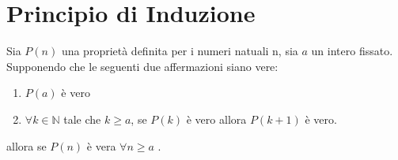 \chapter{Principio di Induzione}

\begin{defn}
Sia $P(n)$ una proprietà definita per i numeri natuali n, sia $a$ un intero fissato.
Supponendo che le seguenti due affermazioni siano vere:
\begin{enumerate}
	\item $P(a)$ è vero
	\item $\forall k \in \mathbb{N}$ tale che $k \geqslant a$, se $P(k)$ è vero allora
	$P(k+1)$ è vero.
\end{enumerate}
allora se $ P(n)$ è vera $\forall n \geqslant a$ .
\end{defn}